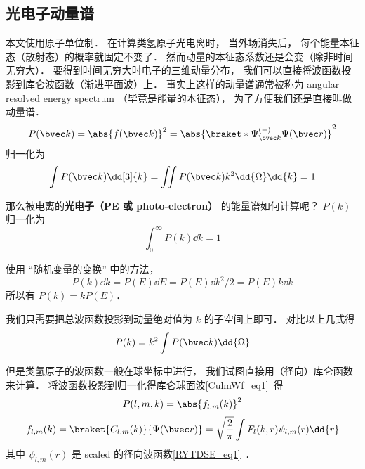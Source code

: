 

\subsection{光电子动量谱}

本文使用原子单位制． 在计算类氢原子光电离时， 当外场消失后， 每个能量本征态（散射态）的概率就固定不变了． 然而动量的本征态系数还是会变（除非时间无穷大）． 要得到时间无穷大时电子的三维动量分布， 我们可以直接将波函数投影到库仑波函数（渐进平面波）上． 事实上这样的动量谱通常被称为 angular resolved energy spectrum （毕竟是能量的本征态）， 为了方便我们还是直接叫做动量谱．
\begin{equation}
P(\bvec k) = \abs{f(\bvec k)}^2 = \abs{\braket*{\Psi^{(-)}_{\bvec k}}{\Psi(\bvec r)}}^2
\end{equation}
归一化为
\begin{equation}
\int P(\bvec k) \dd[3]{k} = \iint P(\bvec k) k^2\dd{\Omega}\dd{k} = 1
\end{equation}

那么被电离的\textbf{光电子（PE 或 photo-electron）} 的能量谱如何计算呢？ $P(k)$ 归一化为
\begin{equation}\label{Hanaly_eq2}
\int_0^\infty P(k) \dd{k} = 1
\end{equation}

 使用 “随机变量的变换” 中的方法，
\begin{equation}\label{Hanaly_eq1}
P(k)\dd{k} = P(E)\dd{E} = P(E)\dd{k^2/2} = P(E)k\dd{k}
\end{equation}
所以有 $P(k) = kP(E)$．

我们只需要把总波函数投影到动量绝对值为 $k$ 的子空间上即可． 对比以上几式得
\begin{equation}
P(k) = k^2 \int P(\bvec k) \dd{\Omega}
\end{equation}

但是类氢原子的波函数一般在球坐标中进行， 我们试图直接用（径向）库仑函数来计算． 将波函数投影到归一化得库仑球面波\autoref{CulmWf_eq1}~得
\begin{equation}
P(l, m, k) = \abs{f_{l,m}(k)}^2 
\end{equation}
\begin{equation}
f_{l,m}(k) = \braket{C_{l,m}(k)}{\Psi(\bvec r)} = \sqrt{\frac{2}{\pi}} \int F_l(k, r) \psi_{l,m}(r) \dd{r}
\end{equation}
其中 $\psi_{l,m}(r)$ 是 scaled 的径向波函数\autoref{RYTDSE_eq1}~．


